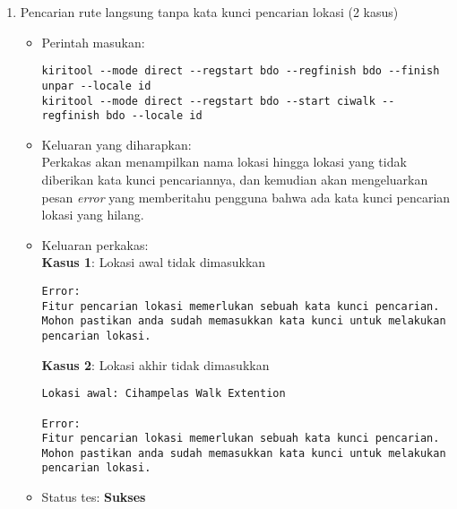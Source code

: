 \begin{enumerate}
	\item Pencarian rute langsung tanpa kata kunci pencarian lokasi (2 kasus)
	\begin{itemize}
		\item Perintah masukan:
		\begin{lstlisting}
kiritool --mode direct --regstart bdo --regfinish bdo --finish unpar --locale id
kiritool --mode direct --regstart bdo --start ciwalk --regfinish bdo --locale id
		\end{lstlisting}
		\item Keluaran yang diharapkan: \\
		Perkakas akan menampilkan nama lokasi hingga lokasi yang tidak diberikan kata kunci pencariannya, dan kemudian akan mengeluarkan pesan \textit{error} yang memberitahu pengguna bahwa ada kata kunci pencarian lokasi yang hilang.
		\item Keluaran perkakas: \\
		\textbf{Kasus 1}: Lokasi awal tidak dimasukkan
		\begin{lstlisting}
Error:
Fitur pencarian lokasi memerlukan sebuah kata kunci pencarian.
Mohon pastikan anda sudah memasukkan kata kunci untuk melakukan pencarian lokasi.
		\end{lstlisting}
		\textbf{Kasus 2}: Lokasi akhir tidak dimasukkan
		\begin{lstlisting}
Lokasi awal: Cihampelas Walk Extention

Error:
Fitur pencarian lokasi memerlukan sebuah kata kunci pencarian.
Mohon pastikan anda sudah memasukkan kata kunci untuk melakukan pencarian lokasi.
		\end{lstlisting}
		\item Status tes: \textbf{Sukses}
	\end{itemize}
	

\end{enumerate}
